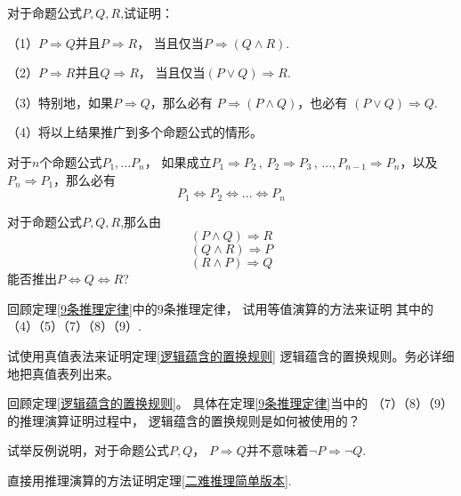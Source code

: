 \begin{prob}对于命题公式$P,Q,R$,试证明：

（1）$P\Rightarrow Q$并且$P\Rightarrow R$，
当且仅当$P\Rightarrow(Q\wedge R)$.

（2）$P\Rightarrow R$并且$Q\Rightarrow R$，
当且仅当$(P\vee Q)\Rightarrow R$.

（3）特别地，如果$P\Rightarrow Q$，那么必有
$P\Rightarrow(P\wedge Q)$，也必有
$(P\vee Q)\Rightarrow Q$.

（4）将以上结果推广到多个命题公式的情形。
\end{prob}\vs

\begin{prob}[循环论证]
对于$n$个命题公式$P_1,...P_n$，
如果成立$P_1\Rightarrow P_2\,,\,P_2\Rightarrow P_3\,,\,...,
P_{n-1}\Rightarrow P_n$，以及$P_n\Rightarrow P_1$，那么必有
$$P_1\Leftrightarrow P_2
\Leftrightarrow...\Leftrightarrow P_n$$
\end{prob}\vs

\begin{prob}对于命题公式$P,Q,R$,那么由
$$(P\wedge Q)\Rightarrow R$$
$$(Q\wedge R)\Rightarrow P$$
$$(R\wedge P)\Rightarrow Q$$
能否推出$P\Leftrightarrow Q\Leftrightarrow R$?
\end{prob}\vs

\begin{prob}[基本推理定律的验证]
回顾定理\ref{9条推理定律}中的9条推理定律，
试用等值演算的方法来证明
其中的（4）（5）（7）（8）（9）.
\end{prob}\vs

\begin{prob}[真值表法的尝试]
试使用真值表法来证明定理\ref{逻辑蕴含的置换规则}
逻辑蕴含的置换规则。务必详细地把真值表列出来。
\end{prob}\vs

\begin{prob}[逻辑蕴含的置换规则的使用]
回顾定理\ref{逻辑蕴含的置换规则}。
具体在定理\ref{9条推理定律}当中的
（7）（8）（9）的推理演算证明过程中，
逻辑蕴含的置换规则是如何被使用的？
\end{prob}\vs

\begin{prob}试举反例说明，对于命题公式$P,Q$，
$P\Rightarrow Q$并不意味着$\neg P\Rightarrow \neg Q$.
\end{prob}\vs

\begin{prob}[二难推理简单版本]
直接用推理演算的方法证明定理\ref{二难推理简单版本}.
\end{prob}\vs

